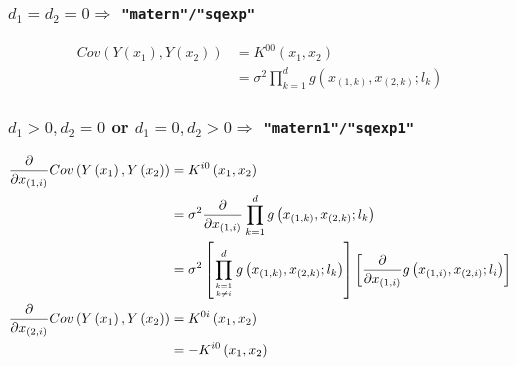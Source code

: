 \documentclass[12pt]{amsart}
\begin{document}
\bigskip
\subsubsection{$d_1 = d_2 = 0 \Rightarrow$ \texttt{"matern"/"sqexp"}}
\begin{align*}
  Cov\left( {Y\left( {{x_1}} \right),Y\left( {{x_2}} \right)} \right) &= {K^{00}}\left( {{x_1},{x_2}} \right)\\
 &= {\sigma ^2}\prod\limits_{k = 1}^d {g\left( {{x_{\left( {1,k} \right)}},{x_{\left( {2,k} \right)}};{l_k}} \right)}
\end{align*}

\bigskip
\subsubsection{$d_1 > 0, d_2 = 0$ or $d_1 = 0, d_2 > 0 \Rightarrow$ \texttt{"matern1"/"sqexp1"}}
\begin{align*}
  \frac{\partial }{{\partial {x_{\left( {1,i} \right)}}}}Cov\left( {Y\left( {{x_1}} \right),Y\left( {{x_2}} \right)} \right) &= {K^{i0}}\left( {{x_1},{x_2}} \right)\\
 &= {\sigma ^2}\frac{\partial }{{\partial {x_{\left( {1,i} \right)}}}}\prod\limits_{k = 1}^d {g\left( {{x_{\left( {1,k} \right)}},{x_{\left( {2,k} \right)}};{l_k}} \right)} \\
 &= {\sigma ^2}\left[ {\prod\limits_{k = 1\atop
k \ne i}^d {g\left( {{x_{\left( {1,k} \right)}},{x_{\left( {2,k} \right)}};{l_k}} \right)} } \right]\left[ {\frac{\partial }{{\partial {x_{\left( {1,i} \right)}}}}g\left( {{x_{\left( {1,i} \right)}},{x_{\left( {2,i} \right)}};{l_i}} \right)} \right]\\
\frac{\partial }{{\partial {x_{\left( {2,i} \right)}}}}Cov\left( {Y\left( {{x_1}} \right),Y\left( {{x_2}} \right)} \right) &= {K^{0i}}\left( {{x_1},{x_2}} \right)\\
 &=  - {K^{i0}}\left( {{x_1},{x_2}} \right)
\end{align*}

\bigskip
\end{document}
